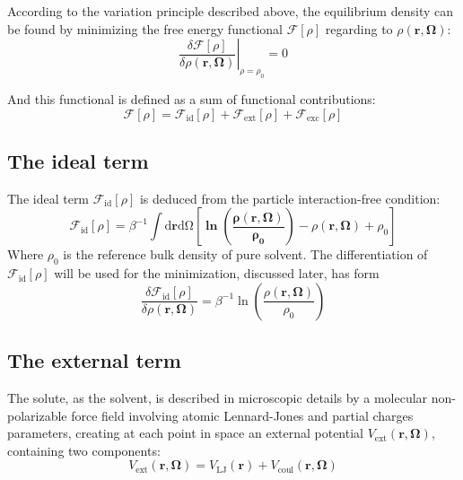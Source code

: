 According to the variation principle described above, the equilibrium
density can be found by minimizing the free energy functional $\mathcal{F}[\rho]$
regarding to $\rho(\mathbf{r},\mathbf{\Omega})$:
\begin{equation}
\left.\frac{\delta\mathcal{F}[\rho]}{\delta\rho(\mathbf{r},\mathbf{\Omega})}\right|_{\rho=\rho_{0}}=0
\end{equation}

And this functional is defined as a sum of functional contributions:
\begin{equation}
\mathcal{F}[\rho]=\mathcal{F}_{\mathrm{id}}[\rho]+\mathcal{F}_{\mathrm{ext}}[\rho]+\mathcal{F}_{\mathrm{exc}}[\rho]\label{eq:fff}
\end{equation}


\subsection{The ideal term}

The ideal term $\mathcal{F}_{\mathrm{id}}[\rho]$ is deduced from
the particle interaction-free condition: 
\begin{equation}
\mathcal{F}_{\mathrm{id}}[\rho]=\beta^{-1}\int\mathrm{d}\mathbf{r}\mathrm{d\Omega}\left[\mathbf{\mathbf{\ln\left(\frac{\rho(\mathbf{r},\mathbf{\mathbf{\mathbf{\mathbf{\Omega}}}})}{\rho_{0}}\right)}}-\rho(\mathbf{r},\mathbf{\mathbf{\mathbf{\Omega}}})+\rho_{0}\right]
\end{equation}
Where $\rho_{0}$ is the reference bulk density of pure solvent. The
differentiation of $\mathcal{F}_{\mathrm{id}}[\rho]$ will be used
for the minimization, discussed later, has form
\begin{equation}
\frac{\delta\mathcal{F}_{\mathrm{id}}[\rho]}{\delta\rho(\mathbf{r},\mathbf{\Omega})}=\beta^{-1}\ln\left(\dfrac{\rho(\mathbf{r},\mathbf{\Omega})}{\rho_{0}}\right)
\end{equation}


\subsection{The external term}

The solute, as the solvent, is described in microscopic details by
a molecular non-polarizable force field involving atomic Lennard-Jones
and partial charges parameters, creating at each point in space an
external potential $V_{\mathrm{ext}}(\mathbf{r},\mathbf{\mathbf{\mathbf{\mathbf{\Omega}}}})$,
containing two components:
\begin{equation}
V_{\mathrm{ext}}(\mathbf{r},\mathbf{\Omega})=V_{\mathrm{LJ}}(\mathbf{r})+V_{\mathrm{coul}}(\mathbf{r},\mathbf{\Omega})
\end{equation}

